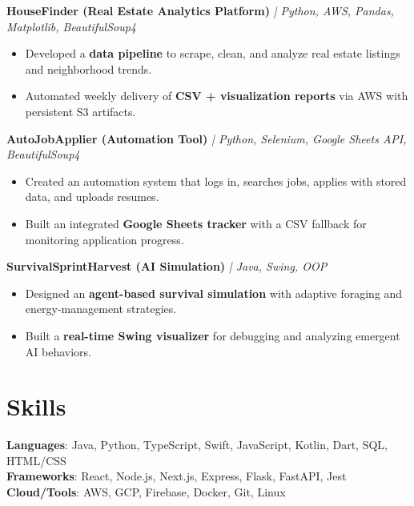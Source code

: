 \documentclass[8pt]{resume}
\begin{document}
\textbf{HouseFinder (Real Estate Analytics Platform)} \textit{| Python, AWS, Pandas, Matplotlib, BeautifulSoup4}
\begin{itemize}
    \item Developed a \textbf{data pipeline} to scrape, clean, and analyze real estate listings and neighborhood trends.
    \item Automated weekly delivery of \textbf{CSV + visualization reports} via AWS with persistent S3 artifacts.
\end{itemize}

\textbf{AutoJobApplier (Automation Tool)} \textit{| Python, Selenium, Google Sheets API, BeautifulSoup4}
\begin{itemize}
    \item Created an automation system that logs in, searches jobs, applies with stored data, and uploads resumes.
    \item Built an integrated \textbf{Google Sheets tracker} with a CSV fallback for monitoring application progress.
\end{itemize}

\textbf{SurvivalSprintHarvest (AI Simulation)} \textit{| Java, Swing, OOP}
\begin{itemize}
    \item Designed an \textbf{agent-based survival simulation} with adaptive foraging and energy-management strategies.
    \item Built a \textbf{real-time Swing visualizer} for debugging and analyzing emergent AI behaviors.
\end{itemize}

\section{Skills}
\textbf{Languages}: Java, Python, TypeScript, Swift, JavaScript, Kotlin, Dart, SQL, HTML/CSS\\
\textbf{Frameworks}: React, Node.js, Next.js, Express, Flask, FastAPI, Jest\\
\textbf{Cloud/Tools}: AWS, GCP, Firebase, Docker, Git, Linux\\
\end{document}
